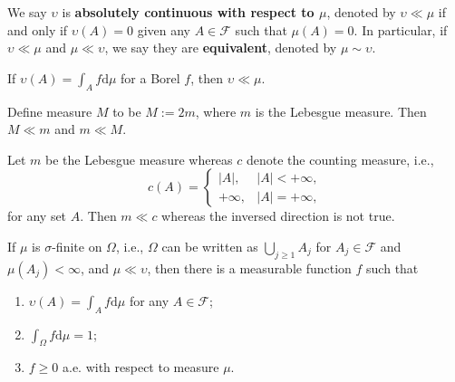 \documentclass[11pt,singlecolumn, openany, citestyle=authoryear]{elegantbook}
\begin{document}
\begin{CJK}{UTF8}{gbsn}
\begin{definition}
    We say $\upsilon$ is \textbf{absolutely continuous with respect to $\mu$},
    denoted by $\upsilon\ll \mu$ if and only if 
    $\upsilon(A)=0$ given any $A\in\mathcal{F}$ such that $\mu(A)=0$.
    In particular, if $\upsilon\ll\mu$ and $\mu\ll\upsilon$, we say 
    they are \textbf{equivalent}, denoted by $\mu \sim \upsilon$.
\end{definition}
\begin{example}
    If $\upsilon(A)=\displaystyle \int_A f\mathrm{d}\mu$ for a Borel $f$, then 
    $\upsilon\ll \mu$.
\end{example}
\begin{example}
    Define measure $M$ to be $M:=2m$, where $m$ is the Lebesgue measure. Then 
    $M\ll m$ and $m\ll M$.
\end{example}
\begin{example}
    Let $m$ be the Lebesgue measure whereas $c$ denote the counting measure, i.e.,
    $$
    c(A)=\begin{cases}
        |A|, & |A| < +\infty,\\
        +\infty, & |A|=+\infty,
    \end{cases}
    $$
    for any set $A$. Then $m\ll c$ whereas the inversed direction is not true.
\end{example}

\begin{theorem}
    If $\mu$ is $\sigma$-finite on $\Omega$, i.e., $\Omega$ can be written as 
    $\displaystyle\bigcup_{j\geqslant 1}A_j$ for $A_j\in\mathcal{F}$ and $\mu(A_j)<\infty$,
    and $\mu\ll \upsilon$, then there is a measurable function $f$ such that 
    \begin{enumerate}
        \item $\displaystyle\upsilon(A)=\int_A f\mathrm{d}\mu$ for any $A\in\mathcal{F}$;
        \item $\displaystyle\int_\Omega f\mathrm{d}\mu = 1$;
        \item $f\geqslant 0$ a.e. with respect to measure $\mu$. 
    \end{enumerate}
\end{theorem}


\end{CJK}
\end{document}
